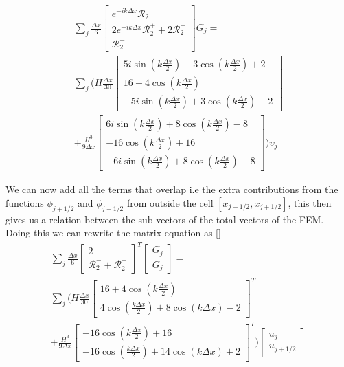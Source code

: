 \documentclass[12pt]{article}
\begin{document}
\begin{multline}
\sum_j \frac{\Delta x}{6}\begin{bmatrix} e^{-ik\Delta x} \mathcal{R}^+_2 \\2 e^{-ik\Delta x} \mathcal{R}^+_2 +2 \mathcal{R}^-_2 \\ \mathcal{R}^-_2 \end{bmatrix} G_j = \\\sum_j \Bigg(H\frac{\Delta x}{30}\begin{bmatrix} 5i\sin\left(k \frac{\Delta x}{2}\right) + 3\cos\left(k \frac{\Delta x}{2}\right) + 2\\16 + 4 \cos\left(k \frac{\Delta x}{2}\right) \\ -5i\sin\left(k \frac{\Delta x}{2}\right) + 3\cos\left(k \frac{\Delta x}{2}\right) + 2 \end{bmatrix} \\+ \frac{H^3 }{9\Delta x}\begin{bmatrix} 6i\sin\left(k \frac{\Delta x}{2}\right) + 8\cos\left(k \frac{\Delta x}{2}\right) - 8 \\ - 16\cos\left(k \frac{\Delta x}{2}\right) + 16 \\ -6i\sin\left(k \frac{\Delta x}{2}\right) + 8\cos\left(k \frac{\Delta x}{2}\right) - 8 \end{bmatrix}  \Bigg) \upsilon_j
\end{multline}

We can now add all the terms that overlap i.e the extra contributions from the functions $\phi_{j+1/2}$ and $\phi_{j-1/2}$ from outside the cell $\left[x_{j-1/2}, x_{j+1/2}\right]$, this then gives us a relation between the sub-vectors of the total vectors of the FEM. Doing this we can rewrite the matrix equation as
[]
\begin{multline}
\sum_j \frac{\Delta x}{6}\begin{bmatrix} 2  \\ \mathcal{R}^-_2 + \mathcal{R}^+_2 \end{bmatrix}^T \begin{bmatrix} G_j  \\ G_j\end{bmatrix}  = \\\sum_j \Bigg(H\frac{\Delta x}{30}\begin{bmatrix}16 + 4 \cos\left(k \frac{\Delta x}{2}\right) \\ 4\cos\left(\frac{k\Delta x}{2}\right) + 8 \cos\left(k \Delta x\right) - 2\end{bmatrix}^T  \\+ \frac{H^3 }{9\Delta x}\begin{bmatrix}  - 16\cos\left(k \frac{\Delta x}{2}\right) + 16 \\ -16\cos\left(\frac{k\Delta x}{2}\right) + 14 \cos\left(k \Delta x\right) + 2 \end{bmatrix}^T    \Bigg) \begin{bmatrix} u_j  \\ u_{j+1/2} \end{bmatrix}
\end{multline}
\end{document}
